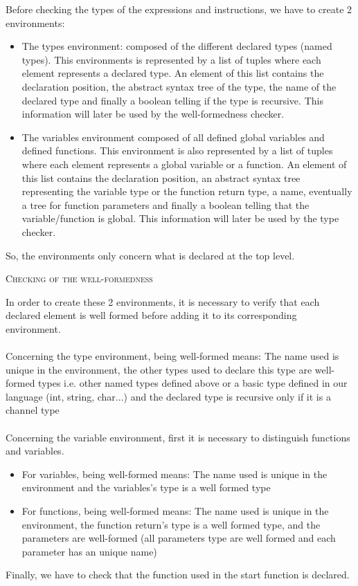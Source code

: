 \documentclass[11pt]{report}
\begin{document}
\tabto{0cm} Before checking the types of the expressions and instructions, we have to create 2 environments:
\begin{itemize}
\item The types environment: composed of the different declared types (named types). This environments is represented by a list of tuples where each element represents a declared type. An element of this list contains the declaration position, the abstract syntax tree of the type, the name of the declared type and finally a boolean telling if the type is recursive. This information will later be used by the well-formedness checker.
\item The variables environment composed of all defined global variables and defined functions. This environment is also represented by a list of tuples where each element represents a global variable or a function. An element of this list contains the declaration position, an abstract syntax tree representing the variable type or the function return type, a name, eventually a tree for function parameters and finally a boolean telling that the variable/function is global. This information will later be used by the type checker.
\end{itemize}
So, the environments only concern what is declared at the top level.\\

\tabto{1cm} {\Large \textsc{Checking of the well-formedness}}

\tabto{0cm}In order to create these 2 environments, it is necessary to verify that each declared element is well formed before adding it to its corresponding environment.\\ \\
Concerning the type environment, being well-formed means: 
The name used is unique in the environment, the other types used to declare this type are well-formed types i.e. other named types defined above or a basic type defined in our language (int, string, char...) and the declared type is recursive only if it is a channel type\\ \\
Concerning the variable environment, first it is  necessary to distinguish functions and variables.
\begin{itemize}
    \item  For variables, being well-formed means: The name used is unique in the environment and the variables's type is a well formed type
    \item For functions, being well-formed means: The name used is unique in the environment, the function return's type is a well formed type, and the parameters are well-formed (all parameters type are well formed and each parameter has an unique name)
\end{itemize}
Finally, we have to check that the function used in the start function is declared.
\end{document}
